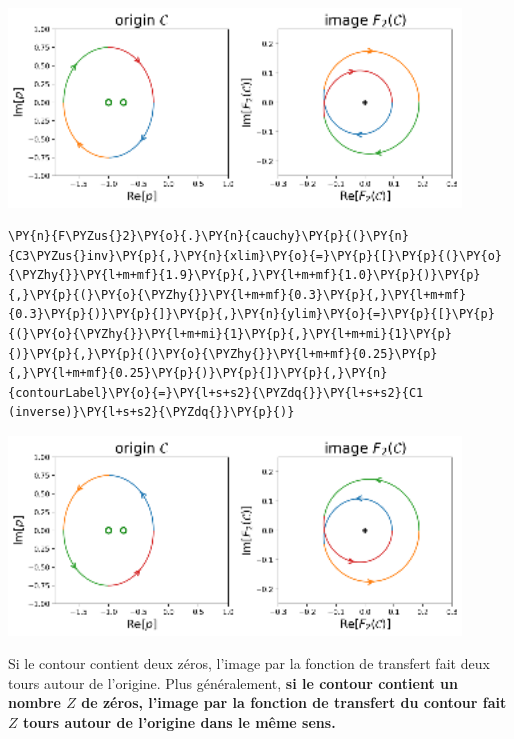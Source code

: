 \begin{center}
    \includegraphics[width=0.9\textwidth]{notebook/fig/output_28_1.eps}
\end{center}
\begin{tcolorbox}[breakable, size=fbox, boxrule=1pt, pad at break*=1mm,colback=cellbackground, colframe=cellborder]
\begin{Verbatim}[commandchars=\\\{\}]
\PY{n}{F\PYZus{}2}\PY{o}{.}\PY{n}{cauchy}\PY{p}{(}\PY{n}{C3\PYZus{}inv}\PY{p}{,}\PY{n}{xlim}\PY{o}{=}\PY{p}{[}\PY{p}{(}\PY{o}{\PYZhy{}}\PY{l+m+mf}{1.9}\PY{p}{,}\PY{l+m+mf}{1.0}\PY{p}{)}\PY{p}{,}\PY{p}{(}\PY{o}{\PYZhy{}}\PY{l+m+mf}{0.3}\PY{p}{,}\PY{l+m+mf}{0.3}\PY{p}{)}\PY{p}{]}\PY{p}{,}\PY{n}{ylim}\PY{o}{=}\PY{p}{[}\PY{p}{(}\PY{o}{\PYZhy{}}\PY{l+m+mi}{1}\PY{p}{,}\PY{l+m+mi}{1}\PY{p}{)}\PY{p}{,}\PY{p}{(}\PY{o}{\PYZhy{}}\PY{l+m+mf}{0.25}\PY{p}{,}\PY{l+m+mf}{0.25}\PY{p}{)}\PY{p}{]}\PY{p}{,}\PY{n}{contourLabel}\PY{o}{=}\PY{l+s+s2}{\PYZdq{}}\PY{l+s+s2}{C1 (inverse)}\PY{l+s+s2}{\PYZdq{}}\PY{p}{)}
\end{Verbatim}
\end{tcolorbox}
\begin{center}
    \includegraphics[width=0.9\textwidth]{notebook/fig/output_29_1.eps}
\end{center}
Si le contour contient deux zéros, l'image par la fonction de transfert
fait deux tours autour de l'origine. Plus généralement, \textbf{si le
contour contient un nombre \(Z\) de zéros, l'image par la fonction de
transfert du contour fait \(Z\) tours autour de l'origine dans le même
sens.} 
